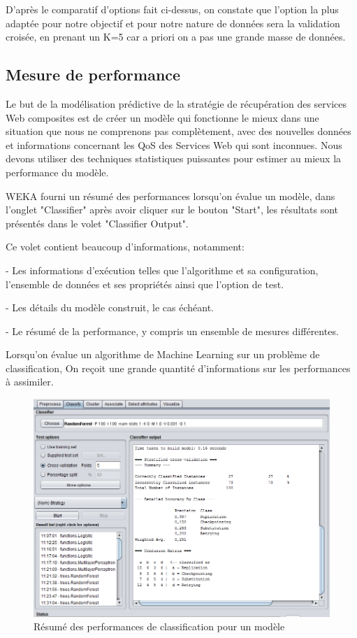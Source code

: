 D'après le comparatif d'options fait ci-dessus, on constate que l'option la plus adaptée pour notre objectif et pour notre nature de données sera la validation croisée, en prenant un  K=5 car a priori on a pas une grande masse de données.

\subsection{Mesure de performance}


Le but de la modélisation prédictive de la stratégie de récupération des services Web composites est de créer un modèle qui fonctionne le mieux dans une situation que nous ne comprenons pas complètement, avec des nouvelles données et informations concernant les QoS des Services Web qui sont inconnues. Nous devons utiliser des techniques statistiques puissantes pour estimer au mieux la performance du modèle.

WEKA fourni un résumé des performances lorsqu'on évalue un modèle, dans l'onglet "Classifier" après avoir cliquer sur le bouton "Start", les résultats sont présentés dans le volet "Classifier Output".

Ce volet contient beaucoup d'informations, notamment:

- Les informations d'exécution telles que l'algorithme et sa configuration, l'ensemble de données et ses propriétés ainsi que l'option de test.

- Les détails du modèle construit, le cas échéant.

- Le résumé de la performance, y compris un ensemble de mesures différentes.

Lorsqu'on évalue un algorithme de Machine Learning sur un problème de classification, On reçoit une grande quantité d'informations sur les performances à assimiler.


\begin{figure}[H]
\begin{center}
\includegraphics[width=1\linewidth]{images/summaryPerf.PNG}
\end{center}
\caption{Résumé des performances de classification pour un modèle}
\label{fig:16}
\end{figure}

